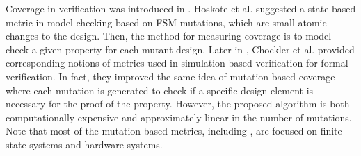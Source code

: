 Coverage in verification was introduced in \cite{hoskote1999coverage, katz1999have}. Hoskote et al. \cite{hoskote1999coverage} suggested a state-based metric in model checking based on FSM mutations, which are small atomic changes to the design. Then, the method for measuring coverage is to model check a given property for each mutant design.
Later in \cite{chockler_coverage_2003}, Chockler et al. provided corresponding notions of metrics used in simulation-based verification for formal verification. In fact, they improved the same idea of mutation-based coverage where each mutation is generated to check if a specific
design element is necessary for the proof of the property.
 However, the proposed algorithm is both computationally expensive and approximately linear
 in the number of mutations. Note that most of the mutation-based metrics, including \cite{kupferman_theory_2008, chockler2001practical}, are focused on finite state systems and hardware systems.

